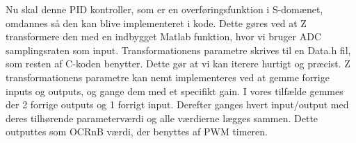 \documentclass[../main.tex]{subfiles}
\begin{document}
Nu skal denne PID kontroller, som er en overføringsfunktion i S-domænet, omdannes så den kan blive implementeret i kode. Dette gøres ved at Z transformere den med en indbygget Matlab funktion, hvor vi bruger ADC samplingsraten som input. Transformationens parametre skrives til en Data.h fil, som resten af C-koden benytter. Dette gør at vi kan iterere hurtigt og præcist. Z transformationens parametre kan nemt implementeres ved at gemme forrige inputs og outputs, og gange dem med et specifikt gain. I vores tilfælde gemmes der 2 forrige outputs og 1 forrigt input. Derefter ganges hvert input/output med deres tilhørende parameterværdi og alle værdierne lægges sammen. Dette outputtes som OCRnB værdi, der benyttes af PWM timeren.

     
\end{document}
